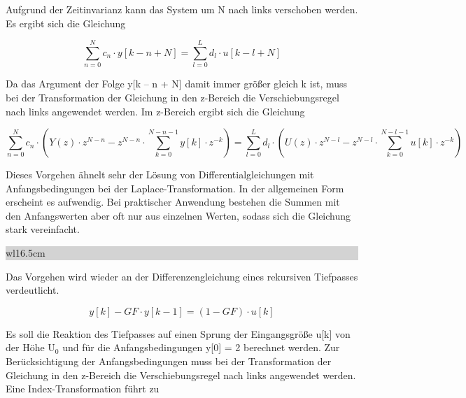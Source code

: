 \noindent Aufgrund der Zeitinvarianz kann das System um N nach links verschoben werden. Es ergibt sich die Gleichung

\begin{equation}\label{eq:sixtwelve}
\sum _{n=0}^{N}c_{n} \cdot y\left[k-n+N\right] =\sum _{l=0}^{L}d_{l} \cdot u\left[k-l+N\right]
\end{equation}

\noindent Da das Argument der Folge y[k -- n + N] damit immer gr\"{o}{\ss}er gleich k ist, muss bei der Transformation der Gleichung in den z-Bereich die Verschiebungsregel nach links angewendet werden. Im z-Bereich ergibt sich die Gleichung 

\begin{equation}\label{eq:sixthirteen}
\sum _{n=0}^{N}c_{n} \cdot \left(Y\left(z\right)\cdot z^{N-n} -z^{N-n} \cdot \sum _{k=0}^{N-n-1}y\left[k\right]\cdot z^{-k}  \right) =\sum _{l=0}^{L}d_{l} \cdot \left(U\left(z\right)\cdot z^{N-l} -z^{N-l} \cdot \sum _{k=0}^{N-l-1}u\left[k\right]\cdot z^{-k}  \right)
\end{equation}

\noindent Dieses Vorgehen \"{a}hnelt sehr der L\"{o}sung von Differentialgleichungen mit Anfangsbedingungen bei der Laplace-Transformation. In der allgemeinen Form erscheint es aufwendig. Bei praktischer Anwendung bestehen die Summen mit den Anfangswerten aber oft nur aus einzelnen Werten, sodass sich die Gleichung stark vereinfacht.\bigskip

\noindent
\colorbox{lightgray}{%
%
\renewcommand\arraystretch{0.6}%
\begin{tabular}{ wl{16.5cm} }
{\selectfont{Beispiel: RC-Tiefpass mit Anfangsbedingungen}}
\end{tabular}%
}\medskip

\noindent Das Vorgehen wird wieder an der Differenzengleichung eines rekursiven Tiefpasses verdeutlicht.

\begin{equation}\label{eq:sixfourteen}
y\left[k\right]-GF\cdot y\left[k-1\right]=\left(1-GF\right)\cdot u\left[k\right]
\end{equation}

\noindent Es soll die Reaktion des Tiefpasses auf einen Sprung der Eingangsgr\"{o}{\ss}e u[k] von der H\"{o}he U${}_{0}$ und f\"{u}r die Anfangsbedingungen y[0] = 2 berechnet werden. Zur Ber\"{u}cksichtigung der Anfangsbedingungen muss bei der Transformation der Gleichung in den z-Bereich die Verschiebungsregel nach links angewendet werden. Eine Index-Transformation f\"{u}hrt zu

